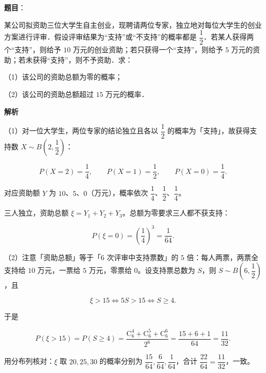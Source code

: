 \begin{answer}

\textbf{题目}：

某公司拟资助三位大学生自主创业，现聘请两位专家，独立地对每位大学生的创业方案进行评审．假设评审结果为“支持”或“不支持”的概率都是 $\dfrac12$．若某人获得两个“支持”，则给予 $10$ 万元的创业资助；若只获得一个“支持”，则给予 $5$ 万元的资助；若未获得“支持”，则不予资助．求：

（1）该公司的资助总额为零的概率；

（2）该公司的资助总额超过 $15$ 万元的概率．

\textbf{解析}

（1）对一位大学生，两位专家的结论独立且各以 $\dfrac12$ 的概率为「支持」，故获得支持数 $X\sim B\left(2,\dfrac12\right)$：

\nopagebreak[4]
\[P(X=2)=\frac14,\qquad P(X=1)=\frac12,\qquad P(X=0)=\frac14.\]

对应资助额 $Y$ 为 $10$、$5$、$0$（万元），概率依次 $\dfrac14$、$\dfrac12$、$\dfrac14$。

三人独立，资助总额 $\xi=Y_1+Y_2+Y_3$。总额为零要求三人都不获支持：

\nopagebreak[4]
\[P(\xi=0)=\left(\frac14\right)^3=\frac1{64}.\]

（2）注意「资助总额」等于「$6$ 次评审中支持票数」的 $5$ 倍：每人两票，两票全支持给 $10$ 万元，一票给 $5$ 万元，零票给 $0$。设支持票总数为 $S$，则 $S\sim B\left(6,\dfrac12\right)$，且

\nopagebreak[4]
\[\xi>15\iff 5S>15\iff S\geqslant4.\]

于是

\nopagebreak[4]
\[P(\xi>15)=P(S\geqslant4)=\frac{\mathrm C_6^4+\mathrm C_6^5+\mathrm C_6^6}{2^6}=\frac{15+6+1}{64}=\frac{11}{32}.\]

用分布列核对：$\xi$ 取 $20,25,30$ 的概率分别为 $\dfrac{15}{64},\dfrac{6}{64},\dfrac{1}{64}$，合计 $\dfrac{22}{64}=\dfrac{11}{32}$，一致。


\end{answer}
